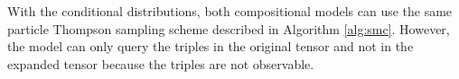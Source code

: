 With the conditional distributions, both compositional models can use the same
particle Thompson sampling scheme described in Algorithm \ref{alg:smc}.
However, the model can only query the triples in the original tensor and 
not in the expanded tensor because the triples are not observable.

